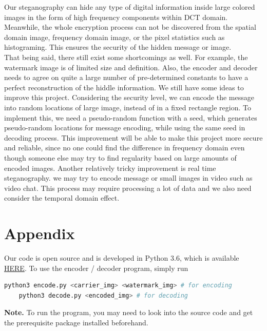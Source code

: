 \documentclass{article}
\begin{document}
Our steganography can hide any type of digital information inside large colored images
in the form of high frequency components within DCT domain. Meanwhile, the whole
encryption process can not be discovered from the spatial domain image,
frequency domain image, or the pixel statistics such as histograming. This
ensures the security of the hidden message or image. \\

That being said, there still exist some shortcomings as well. For example, the
watermark image is of limited size and definition. Also, the encoder and decoder
needs to agree on quite a large number of pre-determined constants to have a perfect
reconstruction of the hiddle information. We still have some ideas to improve
this project. Considering the security level, we can encode the message into
random locations of large image, instead of in a fixed rectangle region. To
implement this, we need a pseudo-random function with a seed, which generates
pseudo-random locations for message encoding, while using the same seed in
decoding process. This improvement will be able to make this project more secure
and reliable, since no one could find the difference in frequency domain even
though someone else may try to find regularity based on large amounts of encoded
images. Another relatively tricky improvement is real time steganography. we may
try to encode message or small images in video such as video chat. This process
may require processing a lot of data and we also need consider the temporal
domain effect.

\section*{Appendix}

Our code is open source and is developed in Python 3.6, which is available
\href{https://github.com/alvinsunyixiao/ece418-stenography}{HERE}. To use
the encoder / decoder program, simply run
\begin{lstlisting}[language=bash]
    python3 encode.py <carrier_img> <watermark_img> # for encoding
    python3 decode.py <encoded_img> # for decoding
\end{lstlisting}
\textbf{Note.} To run the program, you may need to look into the source code
and get the prerequisite package installed beforehand.
\end{document}
